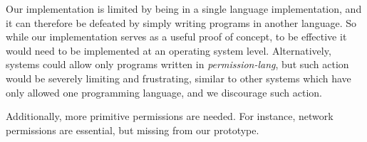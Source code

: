 Our implementation is limited by being in a single language implementation, and it can therefore be defeated by simply writing programs in another language.  So while our implementation serves as a useful proof of concept, to be effective it would need to be implemented at an operating system level.  Alternatively, systems could allow only programs written in \textit{permission-lang}, but such action would be severely limiting and frustrating, similar to other systems which have only allowed one programming language, and we discourage such action.  

Additionally, more primitive permissions are needed.  For instance, network permissions are essential, but missing from our prototype.




